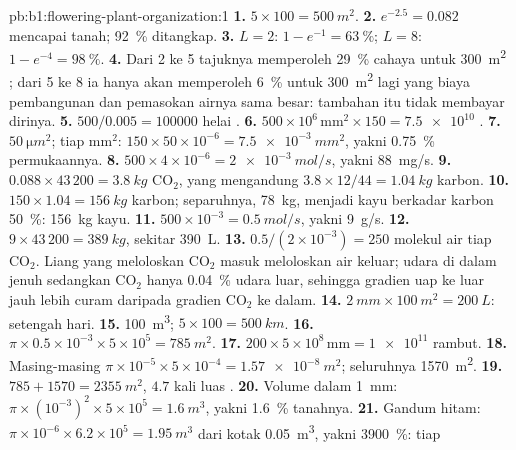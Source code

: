 \begin{solution}{pb:b1:flowering-plant-organization:1}
\textbf{1.} $5\times 100 = \qty{500}{m^2}$.
\textbf{2.} $e^{-2.5} = 0.082$ mencapai tanah; \qty{92}{\%} ditangkap.
\textbf{3.} $L = 2$: $1 - e^{-1} = \qty{63}{\%}$; $L = 8$: $1 -
e^{-4} = \qty{98}{\%}$.
\textbf{4.} Dari 2 ke 5 tajuknya memperoleh \qty{29}{\%} cahaya untuk
\qty{300}{m^2} ; dari 5 ke 8 ia hanya akan memperoleh \qty{6}{\%}
untuk \qty{300}{m^2} lagi yang biaya pembangunan dan pemasokan airnya
sama besar:  tambahan itu tidak membayar dirinya.
\textbf{5.} $500/0.005 = \num{100000}$ helai .
\textbf{6.} $500\times 10^6\,\mathrm{mm^2}\times 150 = \num{7.5e10}$
.
\textbf{7.} $\qty{50}{\micro m^2}$; tiap mm$^2$: $150\times 50\times
10^{-6} = \qty{7.5e-3}{mm^2}$, yakni \qty{0.75}{\%} permukaannya.
\textbf{8.} $500\times 4\times 10^{-6} = \qty{2e-3}{mol/s}$, yakni
\qty{88}{mg/s}.
\textbf{9.} $0.088\times 43\,200 = \qty{3.8}{kg}$ $\mathrm{CO_2}$, yang
mengandung $3.8\times 12/44 = \qty{1.04}{kg}$ karbon.
\textbf{10.} $150\times 1.04 = \qty{156}{kg}$ karbon; separuhnya,
\qty{78}{kg}, menjadi kayu berkadar karbon \qty{50}{\%}: \qty{156}{kg}
kayu.
\textbf{11.} $500\times 10^{-3} = \qty{0.5}{mol/s}$, yakni \qty{9}{g/s}.
\textbf{12.} $9\times 43\,200 = \qty{389}{kg}$, sekitar \qty{390}{L}.
\textbf{13.} $0.5/(2\times 10^{-3}) = 250$ molekul air tiap
$\mathrm{CO_2}$. Liang yang meloloskan $\mathrm{CO_2}$ masuk
meloloskan air keluar; udara di dalam jenuh sedangkan $\mathrm{CO_2}$
hanya \qty{0.04}{\%} udara luar, sehingga gradien uap ke luar jauh lebih
curam daripada gradien $\mathrm{CO_2}$ ke dalam.
\textbf{14.} $\qty{2}{mm}\times\qty{100}{m^2} = \qty{200}{L}$: setengah
hari.
\textbf{15.} \qty{100}{m^3}; $5\times 100 = \qty{500}{km}$.
\textbf{16.} $\pi\times 0.5\times 10^{-3}\times 5\times 10^5 =
\qty{785}{m^2}$.
\textbf{17.} $200\times 5\times 10^8\,\mathrm{mm} = \num{1e11}$ rambut.
\textbf{18.} Masing-masing $\pi\times 10^{-5}\times 5\times 10^{-4} =
\qty{1.57e-8}{m^2}$; seluruhnya \qty{1570}{m^2}.
\textbf{19.} $785 + 1570 = \qty{2355}{m^2}$, $4.7$ kali luas .
\textbf{20.} Volume dalam \qty{1}{mm}: $\pi\times(10^{-3})^2\times 5
\times 10^5 = \qty{1.6}{m^3}$, yakni \qty{1.6}{\%} tanahnya.
\textbf{21.} Gandum hitam: $\pi\times 10^{-6}\times 6.2\times 10^5 =
\qty{1.95}{m^3}$ dari kotak \qty{0.05}{m^3}, yakni \qty{3900}{\%}: tiap

\end{solution}
